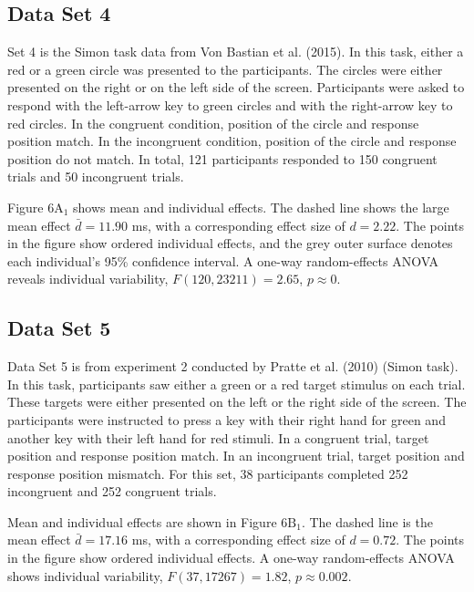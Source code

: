 \documentclass[american,man]{apa6}
\begin{document}
\subsection{Data Set 4}\label{data-set-4}

Set 4 is the Simon task data from Von Bastian et al. (2015). In this
task, either a red or a green circle was presented to the participants.
The circles were either presented on the right or on the left side of
the screen. Participants were asked to respond with the left-arrow key
to green circles and with the right-arrow key to red circles. In the
congruent condition, position of the circle and response position match.
In the incongruent condition, position of the circle and response
position do not match. In total, 121 participants responded to 150
congruent trials and 50 incongruent trials.

Figure 6\(\mbox{A}_1\) shows mean and individual effects. The dashed
line shows the large mean effect \(\bar{d} = 11.90\) ms, with a
corresponding effect size of \(d = 2.22\). The points in the figure show
ordered individual effects, and the grey outer surface denotes each
individual's 95\% confidence interval. A one-way random-effects ANOVA
reveals individual variability, \(F(120, 23211) = 2.65\),
\(p \approx 0\).

\subsection{Data Set 5}\label{data-set-5}

Data Set 5 is from experiment 2 conducted by Pratte et al. (2010) (Simon
task). In this task, participants saw either a green or a red target
stimulus on each trial. These targets were either presented on the left
or the right side of the screen. The participants were instructed to
press a key with their right hand for green and another key with their
left hand for red stimuli. In a congruent trial, target position and
response position match. In an incongruent trial, target position and
response position mismatch. For this set, 38 participants completed 252
incongruent and 252 congruent trials.

Mean and individual effects are shown in Figure 6\(\mbox{B}_1\). The
dashed line is the mean effect \(\bar{d} = 17.16\) ms, with a
corresponding effect size of \(d = 0.72\). The points in the figure show
ordered individual effects. A one-way random-effects ANOVA shows
individual variability, \(F(37, 17267) = 1.82\), \(p \approx 0.002\).
\end{document}
